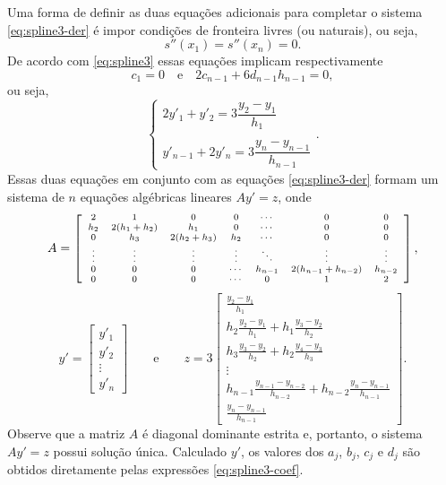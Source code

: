 Uma forma de definir as duas equações adicionais para completar o sistema \eqref{eq:spline3-der} é impor condições de fronteira livres (ou naturais), ou seja,
\begin{equation}
s''(x_1)=s''(x_n)=0.
\end{equation}
De acordo com \eqref{eq:spline3} essas equações implicam respectivamente
\begin{equation}
c_1=0\quad\text{e}\quad 2c_{n-1}+6d_{n-1}h_{n-1}=0,
\end{equation}
ou seja,
\begin{equation}
	\left\{\begin{array}{l}
		2y'_1+y'_2=3\dfrac{y_2-y_1}{h_1}\\
		\\
		y'_{n-1}+2y'_n=3\dfrac{y_n-y_{n-1}}{h_{n-1}}
	\end{array}\right..
\end{equation}
Essas duas equações em conjunto com as equações \eqref{eq:spline3-der} formam um sistema de $n$ equações algébricas lineares $Ay'=z$, onde
\begin{equation}
	\begin{scriptsize}
		A=\left[\begin{array}{ccccccc}
			2 &1&0&0 &\cdots&0&0\\
			h_2&2(h_1+h_2)&h_1&0&\cdots&0&0\\
			0&h_3&2(h_2+h_3)&h_2&\cdots&0&0\\
			\vdots&\vdots&\vdots&\vdots&\ddots&\vdots&\vdots\\
			0&0&0&\cdots&h_{n-1} & 2(h_{n-1}+h_{n-2})&h_{n-2}\\
			0&0&0&\cdots &0&1&2
		\end{array}\right] ,
	\end{scriptsize}
\end{equation}
\begin{equation}
	y' = \left[\begin{array}{c}
		y'_1\\
		y'_2\\
		\vdots\\
		y'_n
	\end{array}\right]\qquad \text{e}\qquad
	z = 3\left[\begin{array}{c}
		\frac{y_2-y_1}{h_1}\\
		h_2\frac{y_2-y_1}{h_1}+h_1\frac{y_3-y_2}{h_2}\\
		h_3\frac{y_3-y_2}{h_2}+h_2\frac{y_4-y_3}{h_3}\\
		\vdots\\
		h_{n-1}\frac{y_{n-1}-y_{n-2}}{h_{n-2}}+h_{n-2}\frac{y_n-y_{n-1}}{h_{n-1}}\\
		\frac{y_n-y_{n-1}}{h_{n-1}}
	\end{array}\right].
\end{equation}
Observe que a matriz $A$ é diagonal dominante estrita e, portanto, o sistema $Ay'=z$ possui solução única. Calculado $y'$, os valores dos $a_j$, $b_j$, $c_j$ e $d_j$ são obtidos diretamente pelas expressões \eqref{eq:spline3-coef}.

